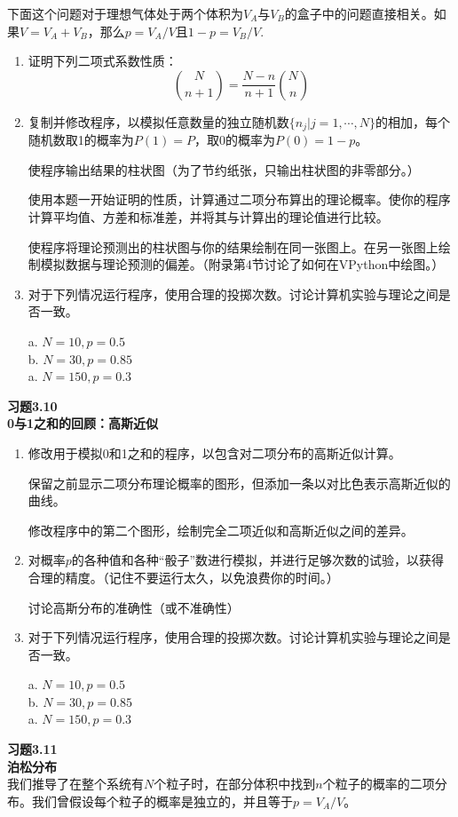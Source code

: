 \documentclass[UTF8]{ctexart}
\numberwithin{equation}{section}%
\numberwithin{figure}{section}%
\begin{document}
    下面这个问题对于理想气体处于两个体积为$V_A$与$V_B$的盒子中的问题直接相关。如果$V=V_A+V_B$，那么$p=V_A/V$且$1-p=V_B/V$.
    \begin{enumerate}
        \item 证明下列二项式系数性质：
    \begin{equation*}
        \binom{N}{n+1}=\frac{N-n}{n+1}\binom{N}{n}
    \end{equation*}
        \item 复制并修改程序，以模拟任意数量的独立随机数$\{n_j|j=1,\cdots,N\}$的相加，每个随机数取1的概率为$P(1)=P$，取0的概率为$P(0)=1-p$。
        
        使程序输出结果的柱状图（为了节约纸张，只输出柱状图的非零部分。）

        使用本题一开始证明的性质，计算通过二项分布算出的理论概率。使你的程序计算平均值、方差和标准差，并将其与计算出的理论值进行比较。
    
        使程序将理论预测出的柱状图与你的结果绘制在同一张图上。在另一张图上绘制模拟数据与理论预测的偏差。（附录第4节讨论了如何在VPython中绘图。）
        \item 对于下列情况运行程序，使用合理的投掷次数。讨论计算机实验与理论之间是否一致。
        
        a. $N=10,p=0.5$\\
        b. $N=30,p=0.85$\\
        a. $N=150,p=0.3$\\
    \end{enumerate}
    \textbf{习题3.10}\label{prob3.10}\\
    \textbf{0与1之和的回顾：高斯近似}\\
    \begin{enumerate}
        \item 修改用于模拟0和1之和的程序，以包含对二项分布的高斯近似计算。
        
        保留之前显示二项分布理论概率的图形，但添加一条以对比色表示高斯近似的曲线。

        修改程序中的第二个图形，绘制完全二项近似和高斯近似之间的差异。

        \item 对概率$p$的各种值和各种“骰子”数进行模拟，并进行足够次数的试验，以获得合理的精度。（记住不要运行太久，以免浪费你的时间。）
    
        讨论高斯分布的准确性（或不准确性）
        \item 对于下列情况运行程序，使用合理的投掷次数。讨论计算机实验与理论之间是否一致。
        
        a. $N=10,p=0.5$\\
        b. $N=30,p=0.85$\\
        a. $N=150,p=0.3$\\
    \end{enumerate}
    \textbf{习题3.11}\label{prob3.11}\\
    \textbf{泊松分布}\\
    我们推导了在整个系统有$N$个粒子时，在部分体积中找到$n$个粒子的概率的二项分布。我们曾假设每个粒子的概率是独立的，并且等于$p=V_A/V$。
\end{document}
